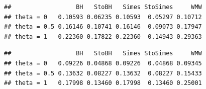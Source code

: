 \documentclass[
]{article}
\newenvironment{Shaded}{\begin{snugshade}}{\end{snugshade}}
\newcommand{\ControlFlowTok}[1]{\textcolor[rgb]{0.13,0.29,0.53}{\textbf{#1}}}
\newcommand{\DecValTok}[1]{\textcolor[rgb]{0.00,0.00,0.81}{#1}}
\newcommand{\FunctionTok}[1]{\textcolor[rgb]{0.00,0.00,0.00}{#1}}
\newcommand{\NormalTok}[1]{#1}
\newcommand{\OtherTok}[1]{\textcolor[rgb]{0.56,0.35,0.01}{#1}}
\newcommand{\SpecialCharTok}[1]{\textcolor[rgb]{0.00,0.00,0.00}{#1}}
\begin{document}
\begin{Shaded}
\end{Shaded}

\begin{verbatim}
##                  BH   StoBH   Simes StoSimes     WMW
## theta = 0   0.10593 0.06235 0.10593  0.05297 0.10712
## theta = 0.5 0.16146 0.10741 0.16146  0.09073 0.17947
## theta = 1   0.22360 0.17822 0.22360  0.14943 0.29363
\end{verbatim}

\begin{Shaded}
\end{Shaded}

\begin{verbatim}
##                  BH   StoBH   Simes StoSimes     WMW
## theta = 0   0.09226 0.04868 0.09226  0.04868 0.09345
## theta = 0.5 0.13632 0.08227 0.13632  0.08227 0.15433
## theta = 1   0.17998 0.13460 0.17998  0.13460 0.25001
\end{verbatim}
\end{document}
